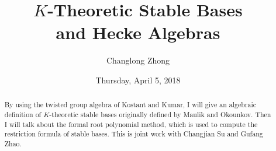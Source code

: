 \documentclass{UAmathtalk}
\author{Changlong Zhong}
\title{$K$-Theoretic Stable Bases\\ and Hecke Algebras}
\date{Thursday, April 5, 2018}
\begin{document}
\maketitle

\begin{abstract}
By using the twisted group algebra of Kostant and Kumar, I will give an algebraic definition of $K$-theoretic stable bases originally defined by Maulik and Okounkov. Then I will talk about the formal root polynomial method, which is used to compute the restriction formula of stable bases. This is joint work with Changjian Su and Gufang Zhao.
\end{abstract}
\end{document}
